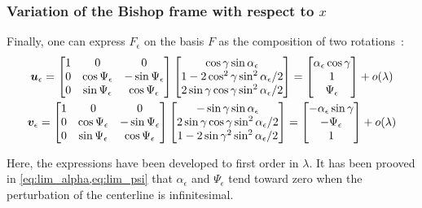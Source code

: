 \subsubsection{Variation of the Bishop frame with respect to $x$}
Finally, one can express $F_\epsilon$ on the basis $F$ as the composition of two rotations~:
\begin{subequations}
	\begin{gather}
	\boldsymbol{u}_\epsilon =
	\begin{bmatrix}
		1 & 0 & 0 \\
		0 & \cos{\Psi_\epsilon} & -\sin{\Psi_\epsilon} \\
		0 & \sin{\Psi_\epsilon} & \cos{\Psi_\epsilon}
	\end{bmatrix}
	\begin{bmatrix}
		\cos{\gamma}\sin{\alpha_\epsilon} \\
		1-2\cos^2{\gamma}\sin^2{\alpha_\epsilon/2} \\
		2\sin{\gamma}\cos{\gamma}\sin^2{\alpha_\epsilon/2}
	\end{bmatrix}
	=
	\begin{bmatrix}
		\alpha_\epsilon\cos{\gamma}\\
		1 \\
		\Psi_\epsilon
	\end{bmatrix}
	+ o(\lambda)
	\\
	\boldsymbol{v}_\epsilon =
	\begin{bmatrix}
		1 & 0 & 0 \\
		0 & \cos{\Psi_\epsilon} & -\sin{\Psi_\epsilon} \\
		0 & \sin{\Psi_\epsilon} & \cos{\Psi_\epsilon}
	\end{bmatrix}
	\begin{bmatrix}
		-\sin{\gamma}\sin{\alpha_\epsilon} \\
		2\sin{\gamma}\cos{\gamma}\sin^2{\alpha_\epsilon/2} \\
		1-2\sin{\gamma}^2\sin^2{\alpha_\epsilon/2}
	\end{bmatrix}
	=
	\begin{bmatrix}
		-\alpha_\epsilon\sin{\gamma}\\
		-\Psi_\epsilon \\
		1
	\end{bmatrix}
	+ o(\lambda)
	\end{gather}
\end{subequations}

%
Here, the expressions have been developed to first order in $\lambda$. It has been prooved in \cref{eq:lim_alpha,eq:lim_psi} that $\alpha_\epsilon$ and $\Psi_\epsilon$ tend toward zero when the perturbation of the centerline is infinitesimal.

